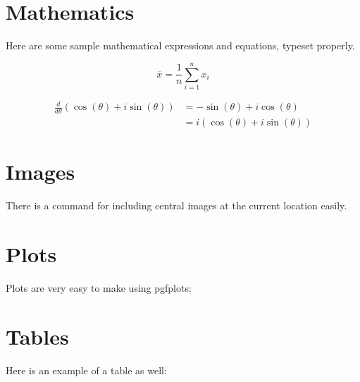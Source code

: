 \section{Mathematics}

Here are some sample mathematical expressions and equations, typeset properly.

\[
    \overline{x} = \frac{1}{n} \sum_{i = 1}^{n} x_{i}
\]

\begin{align*}
    \frac{d}{d\theta} \left( \cos(\theta) + i\sin(\theta) \right) &= -\sin(\theta) + i\cos(\theta) \\
    &= i(\cos(\theta) + i\sin(\theta))
\end{align*}


\section{Images}

There is a command for including central images at the current location easily.


\section{Plots}

Plots are very easy to make using pgfplots:

\begin{center}
\end{center}

\newpage

\section{Tables}

Here is an example of a table as well:

